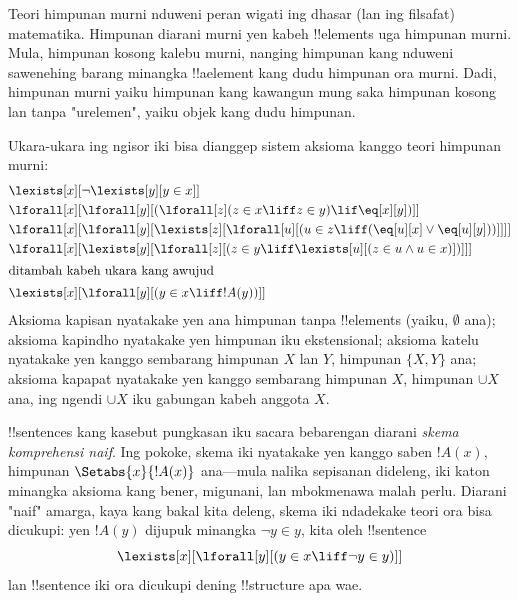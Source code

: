 \documentclass[../../../include/open-logic-section]{subfiles}
\begin{document}
\begin{ex}
Teori himpunan murni nduweni peran wigati ing dhasar
(lan ing filsafat) matematika. Himpunan diarani murni
yen kabeh !!{element}s uga himpunan murni. Mula,
himpunan kosong kalebu murni, nanging himpunan kang
nduweni sawenehing barang minangka !!a{element}
kang dudu himpunan ora murni. Dadi, himpunan murni
yaiku himpunan kang kawangun mung saka himpunan kosong
lan tanpa "urelemen", yaiku objek kang dudu himpunan.

Ukara-ukara ing ngisor iki bisa dianggep sistem aksioma
kanggo teori himpunan murni:
\begin{align*}
& \lexists[x][\lnot \lexists[y][y \in x]]\\
& \lforall[x][\lforall[y][(\lforall[z](z \in x \liff z \in y) \lif 
\eq[x][y])]]\\
& \lforall[x][\lforall[y][\lexists[z][\lforall[u][(u \in z \liff
(\eq[u][x] \lor \eq[u][y]))]]]]\\
& \lforall[x][\lexists[y][\lforall[z][(z \in y \liff \lexists[u][(z \in
        u \land u \in x)])]]]\\
\intertext{ditambah kabeh ukara kang awujud} &
\lexists[x][\lforall[y][(y \in x \liff !A(y))]]
\end{align*}
Aksioma kapisan nyatakake yen ana himpunan tanpa
!!{element}s (yaiku, $\emptyset$ ana); aksioma kapindho
nyatakake yen himpunan iku ekstensional; aksioma katelu
nyatakake yen kanggo sembarang himpunan $X$ lan $Y$,
himpunan $\{X, Y\}$ ana; aksioma kapapat nyatakake
yen kanggo sembarang himpunan $X$, himpunan $\cup X$ ana,
ing ngendi $\cup X$ iku gabungan kabeh anggota $X$.

!!{sentence}s kang kasebut pungkasan iku sacara bebarengan
diarani \emph{skema komprehensi naif}. Ing pokoke,
skema iki nyatakake yen kanggo saben $!A(x)$, himpunan
$\Setabs{x}{!A(x)}$ ana---mula nalika sepisanan dideleng,
iki katon minangka aksioma kang bener, migunani, lan
mbokmenawa malah perlu. Diarani "naif" amarga, kaya
kang bakal kita deleng, skema iki ndadekake teori
ora bisa dicukupi: yen $!A(y)$ dijupuk minangka
$\lnot y \in y$, kita oleh !!{sentence}
\[
\lexists[x][\lforall[y][(y \in x \liff \lnot y \in y)]]
\]
lan !!{sentence} iki ora dicukupi dening !!{structure} apa wae.
\end{ex}
\end{document}
